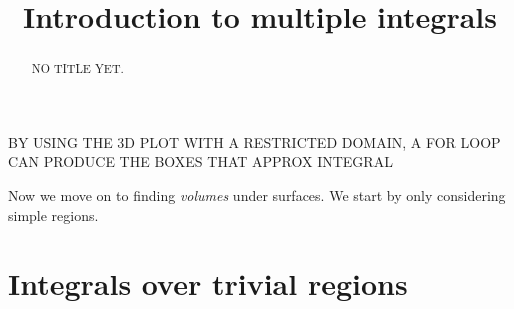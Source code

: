 \documentclass{ximera}
\title[Dig-In:]{Introduction to multiple integrals}
\begin{document}
\begin{abstract}
NO TITLE YET.
\end{abstract}
\maketitle

BY USING THE 3D PLOT WITH A RESTRICTED DOMAIN, A FOR LOOP CAN PRODUCE THE BOXES THAT APPROX INTEGRAL


Now we move on to finding \textit{volumes} under surfaces. We start by
only considering simple regions.

\section{Integrals over trivial regions}
\end{document}
